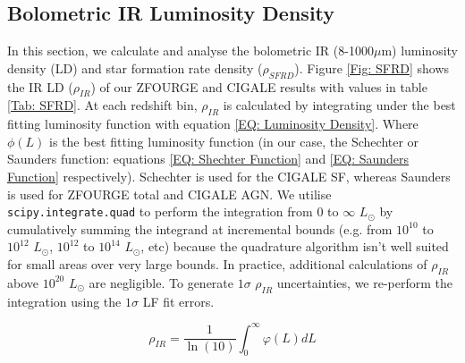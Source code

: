 \subsection{Bolometric IR Luminosity Density} \label{Sec: IR Density}

In this section, we calculate and analyse the bolometric IR (8-1000$\mu$m) luminosity density (LD) and star formation rate density ($\rho_{SFRD}$). Figure \ref{Fig: SFRD} shows the IR LD ($\rho_{IR}$) of our ZFOURGE and CIGALE results with values in table \ref{Tab: SFRD}. At each redshift bin, $\rho_{IR}$ is calculated by integrating under the best fitting luminosity function with equation \ref{EQ: Luminosity Density}. Where $\phi(L)$ is the best fitting luminosity function (in our case, the Schechter or Saunders function: equations \ref{EQ: Shechter Function} and \ref{EQ: Saunders Function} respectively). Schechter is used for the CIGALE SF, whereas Saunders is used for ZFOURGE total and CIGALE AGN. We utilise \texttt{scipy.integrate.quad} \citep{virtanen_scipy_2020} to perform the integration from $0$ to $\infty$ $L_{\odot}$ by cumulatively summing the integrand at incremental bounds (e.g. from $10^{10}$ to $10^{12}$ $L_{\odot}$, $10^{12}$ to $10^{14}$ $L_{\odot}$, etc) because the quadrature algorithm isn't well suited for small areas over very large bounds. In practice, additional calculations of $\rho_{IR}$ above $10^{20}$ $L_{\odot}$ are negligible. To generate $1\sigma$ $\rho_{IR}$ uncertainties, we re-perform the integration using the $1 \sigma$ LF fit errors.

\begin{equation} 
    \rho_{IR} = \frac{1}{\ln(10)} \int_{0}^{\infty} \varphi(L) dL 
    \label{EQ: Luminosity Density}
\end{equation}

